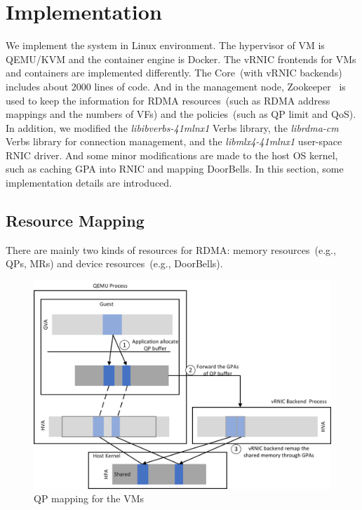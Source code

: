 \section{Implementation} \label{impl}
We implement the \sys system in Linux environment. The hypervisor of VM is QEMU/KVM and the container engine is Docker. The vRNIC frontends for VMs and containers are implemented differently. The \sys Core~(with vRNIC backends) includes about 2000 lines of code.
And in the management node, Zookeeper~\cite{zookeeper} is used to keep the information for RDMA resources~(such as RDMA address mappings and the numbers of VFs) and the policies~(such as QP limit and QoS).
In addition, we modified the \textit{libibverbs-41mlnx1} Verbs library, the \textit{librdma-cm} Verbs library for connection management, and the \textit{libmlx4-41mlnx1} user-space RNIC driver.
And some minor modifications are made to the host OS kernel, such as caching GPA into RNIC and mapping DoorBells. In this section, some implementation details are introduced.

\subsection{Resource Mapping}

There are mainly two kinds of resources for RDMA: memory resources~(e.g., QPs, MRs) and device resources~(e.g., DoorBells). 


\begin{figure}[!ht]
	\centering
	\includegraphics[width=1\linewidth]{images/qp-map.png}
	\caption{QP mapping for the VMs}
	\label{fig:qp-map}
\end{figure}

